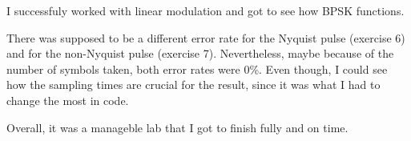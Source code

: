 \documentclass[a4paper,11pt]{article}
\begin{document}
I successfuly worked with linear modulation and got to see how BPSK functions.

There was supposed to be a different error rate for the Nyquist pulse (exercise
6) and for the non-Nyquist pulse (exercise 7). Nevertheless, maybe because of
the number of symbols taken, both error rates were 0\%. Even though, I could
see how the sampling times are crucial for the result, since it was what I had
to change the most in code.

Overall, it was a manageble lab that I got to finish fully and on time. 


\vspace{4cm}
\end{document}
